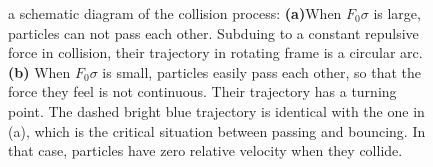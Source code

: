 \documentclass[aps,preprintnumbers,onecolumn,amsmath,amssymb,floatfix,pra]{revtex4-1}
\begin{document}
\begin{figure}[h
]

\caption{a schematic diagram of the collision process: \textbf{(a)}When $F_0\sigma$ is large, particles can not pass each other. Subduing to a constant repulsive force in collision, their trajectory in rotating frame is a circular arc.  \textbf{(b)} When $F_0\sigma$ is small, particles easily pass each other, so that the force they feel is not continuous. Their trajectory has a turning point. The dashed bright blue trajectory is identical with the one in (a), which is the critical situation between passing and bouncing. In that case, particles have zero relative velocity when they collide. }
\label{fig:Breathingfrequency3}
\end{figure}
\end{document}
